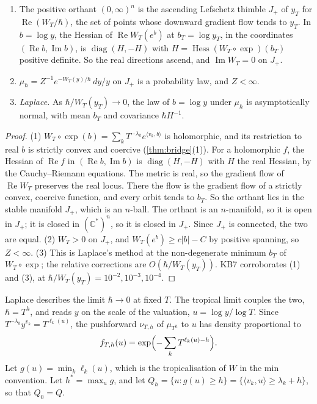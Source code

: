 \documentclass[11pt]{article}
\theoremstyle{definition}\newtheorem{definition}[theorem]{Definition}\newtheorem{remark}[theorem]{Remark}\newtheorem{example}[theorem]{Example}\newtheorem{problem}[theorem]{Open problem}\crefname{problem}{Problem}{Problems}
\begin{document}
\begin{proposition}\label{prop:thimble}
\begin{enumerate}
\item[(1)] The positive orthant $(0,\infty)^n$ is the ascending Lefschetz thimble $J_+$ of $y_T$ for $\operatorname{Re}(W_T/\hbar)$, the set of points whose downward gradient flow
  tends to $y_T$. In $b=\log y$, the Hessian of $\operatorname{Re}W_T(e^{b})$ at $b_T=\log y_T$, in the coordinates $(\operatorname{Re}b,\operatorname{Im}b)$, is $\operatorname{diag}(H,-H)$ with
  $H=\operatorname{Hess}(W_T\circ\exp)(b_T)$ positive definite. So the real directions ascend, and $\operatorname{Im}W_T=0$ on $J_+$.
\item[(2)] $\mu_\hbar=Z^{-1}e^{-W_T(y)/\hbar}\,dy/y$ on $J_+$ is a probability law, and $Z<\infty$.
\item[(3)] \emph{Laplace.} As $\hbar/W_T(y_T)\to0$, the law of $b=\log y$ under $\mu_\hbar$ is asymptotically normal, with mean $b_T$ and covariance $\hbar H^{-1}$.
\end{enumerate}
\end{proposition}

\begin{proof}
(1) $W_T\circ\exp(b)=\sum_kT^{-\lambda_k}e^{\langle v_k,b\rangle}$ is holomorphic, and its restriction to real $b$ is strictly convex and coercive (\cref{thm:bridge}(1)). For a
holomorphic $f$, the Hessian of $\operatorname{Re}f$ in $(\operatorname{Re}b,\operatorname{Im}b)$ is $\operatorname{diag}(H,-H)$ with $H$ the real Hessian, by the Cauchy--Riemann equations. The metric is
real, so the gradient flow of $\operatorname{Re}W_T$ preserves the real locus. There the flow is the gradient flow of a strictly convex, coercive function, and
every orbit tends to $b_T$. So the orthant lies in the stable manifold $J_+$, which is an $n$-ball. The orthant is an $n$-manifold, so it is
open in $J_+$; it is closed in $(\mathbb C^*)^n$, so it is closed in $J_+$. Since $J_+$ is connected, the two are equal.
(2) $W_T>0$ on $J_+$, and $W_T(e^b)\ge c|b|-C$ by positive spanning, so $Z<\infty$. (3) This is Laplace's method at the non-degenerate
minimum $b_T$ of $W_T\circ\exp$; the relative corrections are $O(\hbar/W_T(y_T))$. KB7 corroborates (1) and (3), at $\hbar/W_T(y_T)=10^{-2},10^{-3},10^{-4}$.
\end{proof}

Laplace describes the limit $\hbar\to0$ at fixed $T$. The tropical limit couples the two, $\hbar=T^h$, and reads $y$ on the scale of the
valuation, $u=\log y/\log T$. Since $T^{-\lambda_k}y^{v_k}=T^{\ell_k(u)}$, the pushforward $\nu_{T,h}$ of $\mu_{T^h}$ to $u$ has density proportional to
\[
f_{T,h}(u)=\exp\Bigl(-\sum_kT^{\ell_k(u)-h}\Bigr).
\]
Let $g(u)=\min_k\ell_k(u)$, which is the tropicalisation of $W$ in the min convention. Let $h^*=\max_ug$, and let $Q_h=\{u:g(u)\ge h\}=\{\langle v_k,u\rangle\ge\lambda_k+h\}$, so that $Q_0=Q$.
\end{document}
